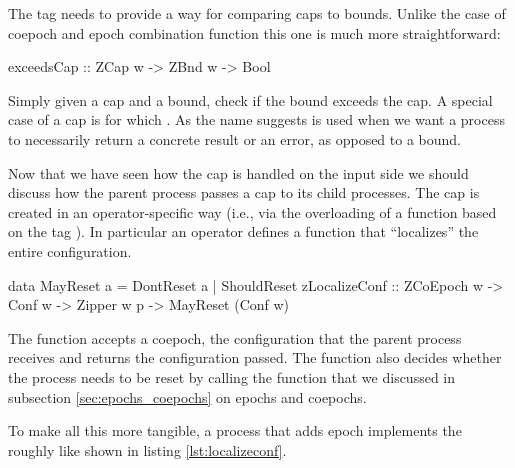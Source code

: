 The  tag needs to provide a way for comparing caps
to bounds. Unlike the case of coepoch and epoch combination function
this one is much more straightforward:

\begin{haskellcode}
exceedsCap :: ZCap w -> ZBnd w -> Bool
\end{haskellcode}

Simply given a cap and a bound, check if the bound exceeds the cap. A
special case of a cap is  for which
. As the name suggests
 is used when we want a process to necessarily
return a concrete result or an error, as opposed to a bound.

Now that we have seen how the cap is handled on the input side we
should discuss how the parent process passes a cap to its child
processes. The cap is created in an operator-specific way (i.e., via the
overloading of a function based on the tag ). In particular an
operator defines a function that ``localizes'' the entire configuration.

\begin{haskellcode}
data MayReset a = DontReset a | ShouldReset
zLocalizeConf :: ZCoEpoch w -> Conf w -> Zipper w p -> MayReset (Conf w)
\end{haskellcode}

The  function accepts a coepoch, the configuration
that the parent process receives and returns the configuration
passed. The  function also decides whether the
process needs to be reset by calling the 
function that we discussed in subsection \ref{sec:epochs_coepochs} on
epochs and coepochs.

To make all this more tangible, a process that adds epoch implements
the  roughly like shown in listing
\ref{lst:localizeconf}.

